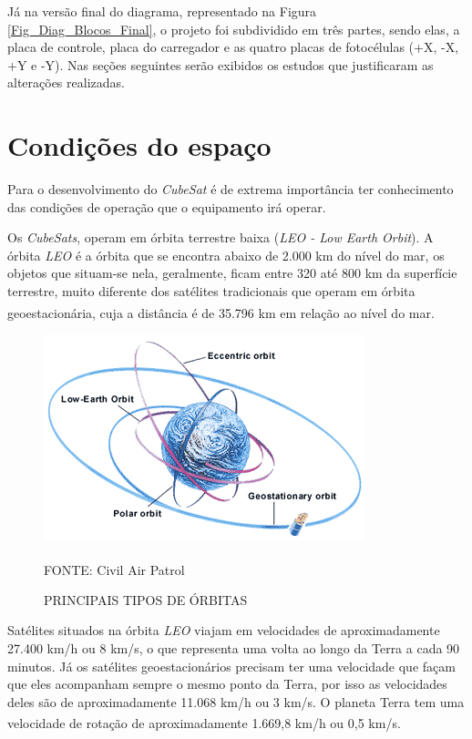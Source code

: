 \documentclass[
	12pt,				%
	openright,			%
	oneside,			%
	a4paper,			%
	english,			%
	french,				%
	spanish,			%
	brazil,				%
	oldfontcommands
	]{abntex2}
\begin{document}
	Já na versão final do diagrama, representado na Figura \ref{Fig_Diag_Blocos_Final}, o projeto foi subdividido em três partes, sendo elas, a placa de controle, placa do carregador e as quatro placas de fotocélulas (+X, -X, +Y e -Y). Nas seções seguintes serão exibidos os estudos que justificaram as alterações realizadas.
 
\section[Condições do espaço]{Condições do espaço}
	
	Para o desenvolvimento do \textit{CubeSat} é de extrema importância ter conhecimento das condições de operação que o equipamento irá operar.
	
	Os \textit{CubeSats}, operam em órbita terrestre baixa (\textit{LEO - Low Earth Orbit}). A órbita \textit{LEO} é a órbita que se encontra abaixo de 2.000 km do nível do mar, os objetos que situam-se nela, geralmente, ficam entre 320 até 800 km da superfície terrestre, muito diferente dos satélites tradicionais que operam em órbita geoestacionária, cuja a distância é de 35.796 km em relação ao nível do mar.\textsuperscript{\cite{LEO}}\textsuperscript{\cite{GEO}}
	
	\begin{figure}[th]
		\caption{PRINCIPAIS TIPOS DE ÓRBITAS}
		\label{Fig_Orbitas}
		\centering
		\includegraphics[width=0.65\linewidth]{./figs/cubesat_03}
			
		\begin{small}
			FONTE: Civil Air Patrol\textsuperscript{\cite{CAP}}
		\end{small}		
	\end{figure}
	
	Satélites situados na órbita \textit{LEO} viajam em velocidades de aproximadamente 27.400 km/h ou 8 km/s, o que representa uma volta ao longo da Terra a cada 90 minutos. Já os satélites geoestacionários precisam ter uma velocidade que façam que eles acompanham sempre o mesmo ponto da Terra, por isso as velocidades deles são de aproximadamente 11.068 km/h ou 3 km/s. O planeta Terra tem uma velocidade de rotação de aproximadamente 1.669,8 km/h ou 0,5 km/s.\textsuperscript{\cite{LEO}}\textsuperscript{\cite{GEO}}
	
\end{document}

